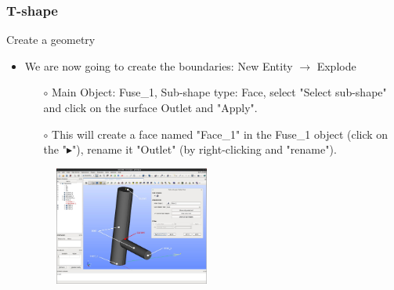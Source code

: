 \documentclass[10pt]{beamer}
\begin{document}
\begin{frame}
\frametitle{T-shape}
\begin{block}{Create a geometry}

\begin{itemize}
\item We are now going to create the boundaries: New Entity $\rightarrow$ Explode \\
    \begin{itemize}
    \item [$\circ$] Main Object: Fuse\_1, Sub-shape type: Face, select "Select sub-shape" and click on the surface Outlet and "Apply".
    \item [$\circ$] This will create a face named "Face\_1" in the Fuse\_1 object (click on the "$\blacktriangleright$"), rename it "Outlet" (by right-clicking and "rename").
    \end{itemize}

\begin{figure}
\includegraphics[width=0.48\textwidth]{PICTURES/salome15.jpg}
\end{figure}
\end{itemize}

\end{block}
\end{frame}
\end{document}
